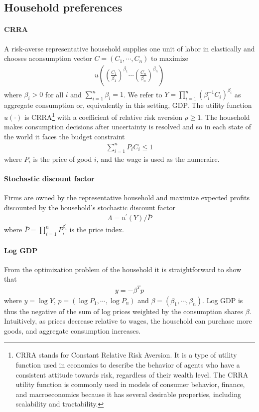 \documentclass[11pt]{article}
\theoremstyle{definition}
\begin{document}
	\subsection{Household preferences}
	\paragraph{CRRA}
	A risk-averse representative household supplies one unit of labor in elastically and chooses aconsumption vector $C = (C_1,\cdots,C_n)$ to maximize
	\begin{align}
		u\left(\left(\frac{C_1}{\beta_1}\right)^{\beta_1}\cdots \left(\frac{C_n}{\beta_n}\right)^{\beta_n}  \right) \label{eq-3}
	\end{align}
	where $\beta_i>0$ for all $i$ and $\sum\limits_{i=1}^n \beta_i = 1$. We refer to $Y = \prod\limits_{i=1}^n (\beta_i^{-1} C_i)^{\beta_i}$ as aggregate consumption or, equivalently in this setting, GDP. The utility function $u(\cdot)$ is CRRA\footnote{CRRA stands for Constant Relative Risk Aversion. It is a type of utility function used in economics to describe the behavior of agents who have a consistent attitude towards risk, regardless of their wealth level. The CRRA utility function is commonly used in models of consumer behavior, finance, and macroeconomics because it has several desirable properties, including scalability and tractability.} with a coefficient of relative risk aversion $\rho\geqslant 1$. The household makes consumption decisions after uncertainty is resolved and so in each state of the world it faces the budget constraint
	\begin{align}
		\sum\limits_{i=1}^n P_iC_i \leqslant 1 \label{eq-4}
	\end{align}
	where $P_i$ is the price of good $i$, and the wage is used as the numeraire.
	
	\paragraph{Stochastic discount factor} 
	Firms are owned by the representative household and maximize expected profits discounted by the household’s stochastic discount factor
	\begin{align}
		\Lambda = u^{\prime}(Y) / \overline{P} \label{eq-5}
	\end{align}
	wbere $\overline{P} = \prod\limits_{i=1}^n P_i^{\beta_i}$ is the price index. 
	
	\paragraph{Log GDP}
	From the optimization problem of the household it is straightforward to show that
	\begin{align}
		y = -\beta^T p \label{eq-6}
	\end{align}
	where $y = \log Y$, $p = (\log P_1,\cdots,\log P_n)$ and $\beta = (\beta_1,\cdots,\beta_n)$. Log GDP is thus the negative of the sum of log prices weighted by the consumption shares $\beta$. Intuitively, as prices decrease relative to wages, the household can purchase more goods, and aggregate consumption increases.
	
\end{document}
